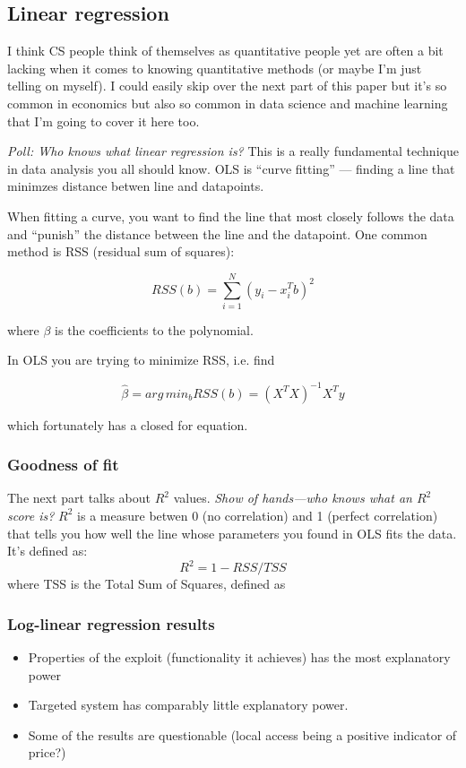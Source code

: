 \documentclass[11pt]{article}
\begin{document}
\subsection{Linear regression}

I think CS people think of themselves as quantitative people yet are often a bit lacking when it comes to knowing quantitative methods (or maybe I'm just telling on myself). I could easily skip over the next part of this paper but it's so common in economics but also so common in data science and machine learning that I'm going to cover it here too. 

{\it Poll: Who knows what linear regression is?} This is a really fundamental technique in data analysis you all should know. 
OLS is ``curve fitting'' --- finding a line that minimzes distance betwen line and datapoints. 

When fitting a curve, you want to find the line that most closely follows the data and ``punish'' the distance between the line and the datapoint. One common method is RSS (residual sum of squares):

$$ RSS(b) = \sum_{i=1}^N (y_i - x_i^{T}b)^2 $$ 

where $\beta$ is the coefficients to the polynomial. 

In OLS you are trying to minimize RSS, i.e. find 

$$ \hat{\beta} = arg\,min_b RSS(b) = (X^{T}X)^{-1}X^{T}y$$

which fortunately has a closed for equation. 

\subsubsection{Goodness of fit}

The next part talks about $R^2$ values. {\it Show of hands---who knows what an $R^2$ score is?} $R^2$ is a measure betwen 0 (no correlation) and 1 (perfect correlation) that tells you how well the line whose parameters you found in OLS fits the data. It's defined as:
$$ R^2 = 1 - RSS / TSS$$ 
where TSS is the Total Sum of Squares, defined as 


\subsubsection{Log-linear regression results}

\begin{itemize}
    \item Properties of the exploit (functionality it achieves) has the most explanatory power
    \item Targeted system has comparably little explanatory power.
    \item Some of the results are questionable (local access being a positive indicator of price?)
\end{itemize}
\end{document}
